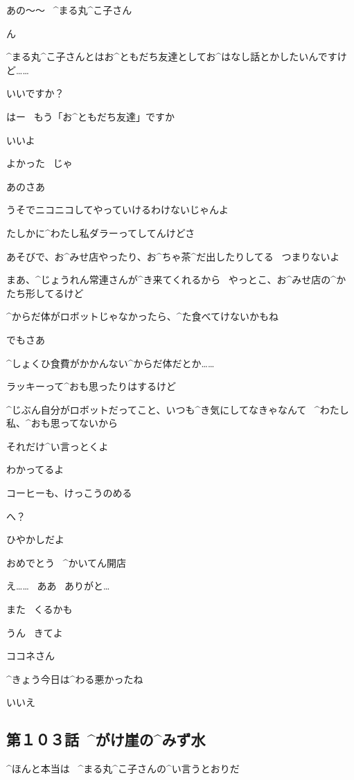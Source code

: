 \page
\A あの〜〜
\ ^{まる}{丸}^{こ}{子}さん

\R ん

\A ^{まる}{丸}^{こ}{子}さんとはお^{ともだち}{友達}としてお^{はなし}{話}とかしたいんですけど……

\A いいですか？

\R はー
\ もう「お^{ともだち}{友達}」ですか

\R いいよ

\A よかった
\ じゃ

\page
\A あのさあ

\A うそでニコニコしてやっていけるわけないじゃんよ

\page
\A たしかに^{わたし}{私}ダラーってしてんけどさ

\A あそびで、お^{みせ}{店}やったり、お^{ちゃ}{茶}^{だ}{出}したりしてる
\ つまりないよ

\A まあ、^{じょうれん}{常連}さんが^{き}{来}てくれるから
\ やっとこ、お^{みせ}{店}の^{かたち}{形}してるけど

\A ^{からだ}{体}がロボットじゃなかったら、^{た}{食}べてけないかもね

\A でもさあ

\page
\A ^{しょくひ}{食費}がかかんない^{からだ}{体}だとか……

\A ラッキーって^{おも}{思}ったりはするけど

\A ^{じぶん}{自分}がロボットだってこと、いつも^{き}{気}にしてなきゃなんて
\ ^{わたし}{私}、^{おも}{思}ってないから

\A それだけ^{い}{言}っとくよ

\page
\R わかってるよ

\R コーヒーも、けっこうのめる

\A へ？

\page
\R ひやかしだよ

\R おめでとう
\ ^{かいてん}{開店}

\A え……
\ ああ
\ ありがと…

\page
\R また
\ くるかも

\A うん
\ きてよ

\page
\R ココネさん

\R ^{きょう}{今日}は^{わる}{悪}かったね

\K いいえ


\subsection{第１０３話\ ^{がけ}{崖}の^{みず}{水}}

\page[43]
\A ^{ほんと}{本当}は
\ ^{まる}{丸}^{こ}{子}さんの^{い}{言}うとおりだ

